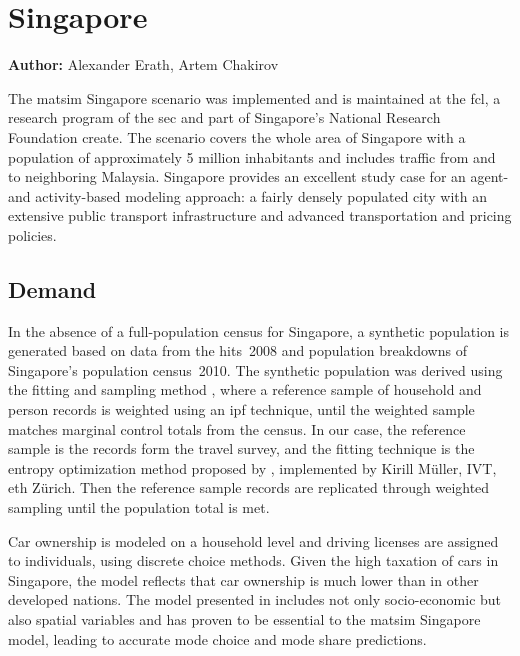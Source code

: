 \section{Singapore}
\label{sec:singapore}
\hfill \textbf{Author:} Alexander Erath, Artem Chakirov

The \gls{matsim} Singapore scenario \citet[][]{ErathEtAl_TechRep_FCL_forth} was implemented and is maintained at the \gls{fcl}, a research program of the \gls{sec} and part of Singapore's National Research Foundation \gls{create}. The scenario covers the whole area of Singapore with a population of approximately 5 million inhabitants and includes traffic from and to neighboring Malaysia. Singapore provides an excellent study case for an agent- and activity-based modeling approach: a fairly densely populated city with an extensive public transport infrastructure and advanced transportation and pricing policies. 

\subsection{Demand}
In the absence of a full-population census for Singapore, a synthetic population is generated based on data from the \gls{hits}~2008 \citep[][]{Choi_JOUR_2010} and population breakdowns of Singapore’s population census~2010. The synthetic population was derived using the fitting and sampling method \citep{MuellerKAxhausen_TRB_2011}, where a reference sample of household and person records is weighted using an \gls{ipf} technique, until the weighted sample matches marginal control totals from the census. In our case, the reference sample is the records form the travel survey, and the fitting technique is the entropy optimization method proposed by \citet[][]{BarGeraEtAl_TRB_2009}, implemented by Kirill Müller, IVT, \gls{eth} Zürich. Then the reference sample records are replicated through weighted sampling until the population total is met. 
 
Car ownership is modeled on a household level and driving licenses are assigned to individuals, using discrete choice methods. Given the high taxation of cars in Singapore, the model reflects that car ownership is much lower than in other developed nations. The model presented in \citet[][]{VanEggermondEtAl_IATBR_2012} includes not only socio-economic but also spatial variables and has proven to be essential to the \gls{matsim} Singapore model, leading to accurate mode choice and mode share predictions. 

